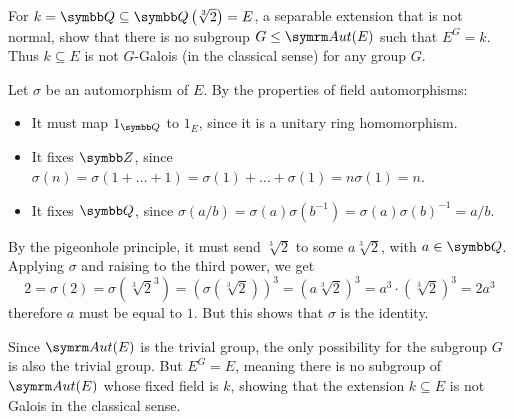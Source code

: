 \begin{exercise}
For \(k = \rationals \subseteq \adjoin{\sqrt[3]{2}} = E\), a separable extension that is not normal, show that there is no subgroup \(G \leq \Aut(E)\) such that \(E^{G} = k\). Thus \(k \subseteq E\) is not \(G\)-Galois (in the classical sense) for any group \(G\).
\end{exercise}
\begin{solution}
Let \(\sigma\) be an automorphism of \(E\). By the properties of field automorphisms:
\begin{itemize}
    \item It must map \(1_{\rationals}\) to \(1_{E}\), since it is a unitary ring homomorphism.
    \item It fixes \(\integers\), since \(\sigma(n) = \sigma(1 + \dots + 1) = \sigma(1) + \dots + \sigma(1) = n \sigma(1) = n\).
    \item It fixes \(\rationals\), since \(\sigma(a/b) = \sigma(a) \sigma\left(b^{-1}\right) = \sigma(a) \sigma(b)^{-1} = a/b\).
\end{itemize}
By the pigeonhole principle, it must send \(\sqrt[3]{2}\) to some \(a \sqrt[3]{2}\), with \(a \in \rationals\). Applying \(\sigma\) and raising to the third power, we get
\[
    2 = \sigma(2) = \sigma\left(\sqrt[3]{2}^3\right) = \left(\sigma\left(\sqrt[3]{2}\right)\right)^3 = \left(a \sqrt[3]{2}\right)^3 = a^3 \cdot \left(\sqrt[3]{2}\right)^3 = 2 a^3
\]
therefore \(a\) must be equal to \(1\). But this shows that \(\sigma\) is the identity.

Since \(\Aut(E)\) is the trivial group, the only possibility for the subgroup \(G\) is also the trivial group. But \(E^{G} = E\), meaning there is no subgroup of \(\Aut(E)\) whose fixed field is \(k\), showing that the extension \(k \subseteq E\) is not Galois in the classical sense.
\end{solution}
